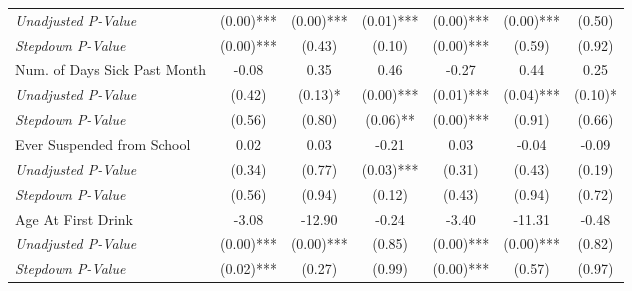 \begin{tabular}{l c c c c c c}
\quad \textit{Unadjusted P-Value} & (0.00)*** & (0.00)*** & (0.01)*** & (0.00)*** & (0.00)*** & (0.50) \\
\quad \textit{Stepdown P-Value} & (0.00)*** & (0.43) & (0.10) & (0.00)*** & (0.59) & (0.92) \\
Num. of Days Sick Past Month & -0.08 & 0.35 & 0.46 & -0.27 & 0.44 & 0.25 \\
\quad \textit{Unadjusted P-Value} & (0.42) & (0.13)* & (0.00)*** & (0.01)*** & (0.04)*** & (0.10)* \\
\quad \textit{Stepdown P-Value} & (0.56) & (0.80) & (0.06)** & (0.00)*** & (0.91) & (0.66) \\
Ever Suspended from School & 0.02 & 0.03 & -0.21 & 0.03 & -0.04 & -0.09 \\
\quad \textit{Unadjusted P-Value} & (0.34) & (0.77) & (0.03)*** & (0.31) & (0.43) & (0.19) \\
\quad \textit{Stepdown P-Value} & (0.56) & (0.94) & (0.12) & (0.43) & (0.94) & (0.72) \\
Age At First Drink & -3.08 & -12.90 & -0.24 & -3.40 & -11.31 & -0.48 \\
\quad \textit{Unadjusted P-Value} & (0.00)*** & (0.00)*** & (0.85) & (0.00)*** & (0.00)*** & (0.82) \\
\quad \textit{Stepdown P-Value} & (0.02)*** & (0.27) & (0.99) & (0.00)*** & (0.57) & (0.97) \\
\bottomrule
\end{tabular}
